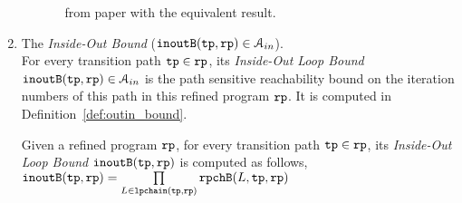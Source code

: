 \begin{enumerate}
\begin{enumerate}
\begin{itemize}
from paper \cite{GulwaniJK09} with the equivalent result.
\end{itemize}
\end{enumerate}
\item The \emph{Inside-Out Bound} ($\mathtt{inoutB}(\mathtt{tp}, \mathtt{rp}) \in \mathcal{A}_{in}$).
\\
For every transition path $\mathtt{tp} \in \mathtt{rp}$, its \emph{Inside-Out Loop Bound}
 $\mathtt{inoutB}(\mathtt{tp}, \mathtt{rp}) \in \mathcal{A}_{in}$ is 
the path sensitive reachability bound on the iteration numbers of this path in this refined program $\mathtt{rp}$. 
It is computed in Definition~\ref{def:outin_bound}.
\begin{defn}
  \label{def:outin_bound}
  Given a refined program $\mathtt{rp}$, for every transition path $\mathtt{tp} \in \mathtt{rp}$, 
  its \emph{Inside-Out Loop Bound}
  $\mathtt{inoutB}(\mathtt{tp}, \mathtt{rp})$ is 
 computed as follows,
$\mathtt{inoutB}(\mathtt{tp}, \mathtt{rp}) =
  \prod\limits_{L \in \mathtt{lpchain}(\mathtt{tp}, \mathtt{rp})} \mathtt{rpchB}(L, \mathtt{tp}, \mathtt{rp})
$
\end{defn}
\end{enumerate}
%
